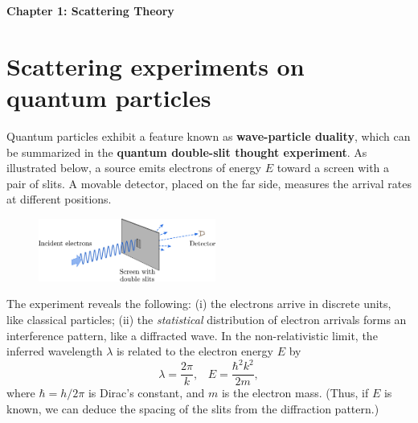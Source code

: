 \documentclass[pra,12pt]{revtex4-2}
\begin{document}
\begin{center}
{\Large \textbf{Chapter 1: Scattering Theory}}
\end{center}


\section{Scattering experiments on quantum particles}
\label{sec:scatintro}

Quantum particles exhibit a feature known as \textbf{wave-particle
  duality}, which can be summarized in the \textbf{quantum double-slit
  thought experiment}.  As illustrated below, a source emits electrons
of energy $E$ toward a screen with a pair of slits.  A movable
detector, placed on the far side, measures the arrival rates at
different positions.

\begin{figure}[h]
  \centering\includegraphics[width=0.52\textwidth]{doubleslit}
\end{figure}

The experiment reveals the following: (i) the electrons arrive in
discrete units, like classical particles; (ii) the
\textit{statistical} distribution of electron arrivals forms an
interference pattern, like a diffracted wave.  In the non-relativistic
limit, the inferred wavelength $\lambda$ is related to the electron
energy $E$ by
\begin{equation}
  \lambda = \frac{2\pi}{k}, \;\;\; E = \frac{\hbar^2k^2}{2m},
\end{equation}
where $\hbar = h/2\pi$ is Dirac's constant, and $m$ is the electron
mass.  (Thus, if $E$ is known, we can deduce the spacing of the slits
from the diffraction pattern.)

\end{document}
